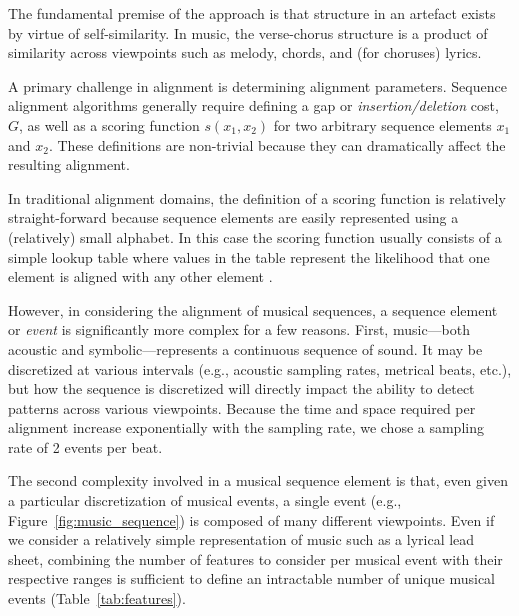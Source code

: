 \documentclass[phd,electronic,oneside,twosidetoc,letterpaper,chaptercenter,parttop,lof,lot]{byumsphd}
\begin{document}
The fundamental premise of the approach is that structure in an artefact exists by virtue of self-similarity. In music, the verse-chorus structure is a product of similarity across viewpoints such as melody, chords, and (for choruses) lyrics.

A primary challenge in alignment is determining alignment parameters. Sequence alignment algorithms generally require defining a gap or \textit{insertion/deletion} cost, $G$, as well as a scoring function $s(x_1,x_2)$ for two arbitrary sequence elements $x_1$ and $x_2$. These definitions are non-trivial because they can dramatically affect the resulting alignment.

In traditional alignment domains, the definition of a scoring function is relatively straight-forward because sequence elements are easily represented using a (relatively) small alphabet. In this case the scoring function usually consists of a simple lookup table where values in the table represent the likelihood that one element is aligned with any other element \cite{henikoff1992amino}.

However, in considering the alignment of musical sequences, a sequence element or \textit{event} is significantly more complex for a few reasons. First, music---both acoustic and symbolic---represents a continuous sequence of sound. It may be discretized at various intervals (e.g., acoustic sampling rates, metrical beats, etc.), but how the sequence is discretized will directly impact the ability to detect patterns across various viewpoints. Because the time and space required per alignment increase exponentially with the sampling rate, we chose a sampling rate of 2 events per beat.

The second complexity involved in a musical sequence element is that, even given a particular discretization of musical events, a single event (e.g., Figure~\ref{fig:music_sequence}) is composed of many different viewpoints. Even if we consider a relatively simple representation of music such as a lyrical lead sheet, combining the number of features to consider per musical event with their respective ranges is sufficient to define an intractable number of unique musical events (Table~\ref{tab:features}).
\end{document}
